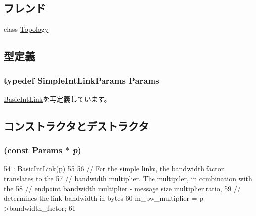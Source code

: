 \subsection*{フレンド}
\begin{DoxyCompactItemize}
\item 
class \hyperlink{classSimpleIntLink_acd2b8699ab7559c0da687cd775e2c778}{Topology}
\end{DoxyCompactItemize}


\subsection{型定義}
\hypertarget{classSimpleIntLink_a16df42348b8967c4cc4aa2b9c9fafdf9}{
\subsubsection[{Params}]{\setlength{\rightskip}{0pt plus 5cm}typedef SimpleIntLinkParams {\bf Params}}}
\label{classSimpleIntLink_a16df42348b8967c4cc4aa2b9c9fafdf9}


\hyperlink{classBasicIntLink_a22036d2d68b49d72b25678790aae2c9e}{BasicIntLink}を再定義しています。

\subsection{コンストラクタとデストラクタ}
\hypertarget{classSimpleIntLink_a964bbc17307fe8f150fcdddf39268d65}{
\subsubsection[{SimpleIntLink}]{ (const {\bf Params} $\ast$ {\em p})}}
\label{classSimpleIntLink_a964bbc17307fe8f150fcdddf39268d65}



\begin{DoxyCode}
54     : BasicIntLink(p)
55 {
56     // For the simple links, the bandwidth factor translates to the
57     // bandwidth multiplier.  The multipiler, in combination with the 
58     // endpoint bandwidth multiplier - message size multiplier ratio, 
59     // determines the link bandwidth in bytes 
60     m_bw_multiplier = p->bandwidth_factor;
61 }
\end{DoxyCode}


